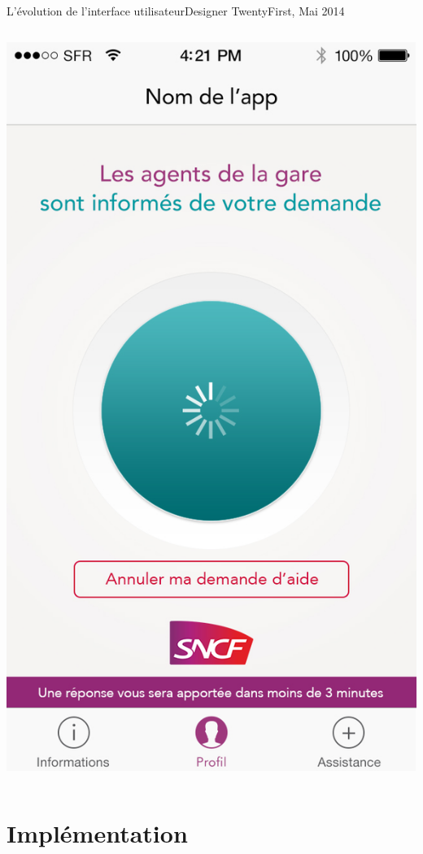 \documentclass{beamer}
\begin{document}
\begin{frame}{L'évolution de l'interface utilisateur}{Designer TwentyFirst, Mai 2014}
\begin{columns}
\begin{column}{0.45\textwidth}
            \includegraphics[width=\textwidth]{thibault-04/02-encours.jpg}
        \end{column}
    \end{columns}
\end{frame}
\section{Implémentation}
\end{document}
